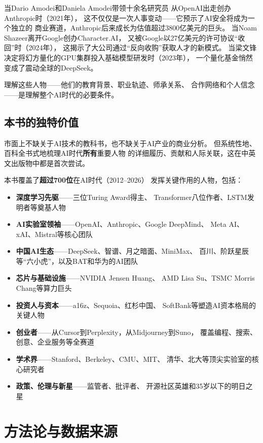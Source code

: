 当Dario Amodei和Daniela Amodei带领十余名研究员
从OpenAI出走创办Anthropic时（2021年），
这不仅仅是一次人事变动——它预示了AI安全将成为一个独立的
商业赛道，Anthropic后来成长为估值超过3800亿美元的巨头。
当Noam Shazeer离开Google创办Character.AI，
又被Google以27亿美元的许可协议``收回''时（2024年），
这揭示了大公司通过``反向收购''获取人才的新模式。
当梁文锋决定将幻方量化的GPU集群投入基础模型研发时（2023年），
一个量化基金悄然变成了震动全球的DeepSeek。

理解这些人物——他们的教育背景、职业轨迹、师承关系、
合作网络和个人信念——是理解整个AI时代的必要条件。

\subsection{本书的独特价值}

市面上不缺关于AI技术的教科书，也不缺关于AI产业的商业分析。
但系统性地、百科全书式地梳理AI时代\textbf{所有}重要人物
的详细履历、贡献和人际关联，这在中英文出版物中都是首次尝试。

本书覆盖了\textbf{超过700位}在AI时代（2012--2026）
发挥关键作用的人物，包括：

\begin{itemize}
  \item \textbf{深度学习先驱}——三位Turing Award得主、
    Transformer八位作者、LSTM发明者等奠基人物
  \item \textbf{AI实验室领袖}——OpenAI、Anthropic、Google DeepMind、
    Meta AI、xAI、Mistral等核心团队
  \item \textbf{中国AI生态}——DeepSeek、智谱、月之暗面、MiniMax、
    百川、阶跃星辰等``六小虎''，以及BAT和华为的AI团队
  \item \textbf{芯片与基础设施}——NVIDIA Jensen Huang、
    AMD Lisa Su、TSMC Morris Chang等算力巨头
  \item \textbf{投资人与资本}——a16z、Sequoia、红杉中国、
    SoftBank等塑造AI资本格局的关键人物
  \item \textbf{创业者}——从Cursor到Perplexity，从Midjourney到Suno，
    覆盖编程、搜索、创意、企业服务等全赛道
  \item \textbf{学术界}——Stanford、Berkeley、CMU、MIT、
    清华、北大等顶尖实验室的核心研究者
  \item \textbf{政策、伦理与新星}——监管者、批评者、
    开源社区英雄和35岁以下的明日之星
\end{itemize}


\section{方法论与数据来源}
\label{sec:overview-method}

